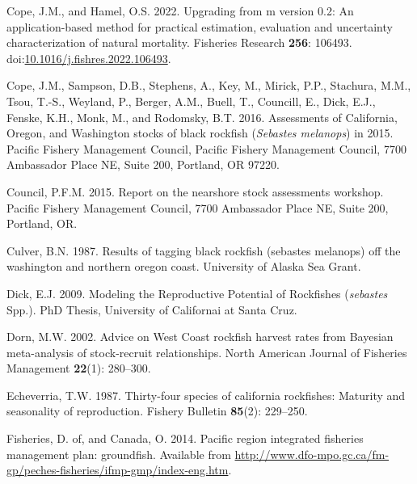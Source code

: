 \documentclass[11pt,
  english,
  letterpaper,
]{article}
\newlength{\cslhangindent}
\newenvironment{CSLReferences}[2] %
 {%
  \setlength{\parindent}{0pt}
  \ifodd #1 \everypar{\setlength{\hangindent}{\cslhangindent}}\ignorespaces\fi
  \ifnum #2 > 0
  \setlength{\parskip}{#2\baselineskip}
  \fi
 }%
 {}
\begin{document}
\begin{CSLReferences}{1}{0}
\leavevmode{}%
Cope, J.M., and Hamel, O.S. 2022. Upgrading from m version 0.2: An application-based method for practical estimation, evaluation and uncertainty characterization of natural mortality. Fisheries Research \textbf{256}: 106493. doi:\href{https://doi.org/10.1016/j.fishres.2022.106493}{10.1016/j.fishres.2022.106493}.

\leavevmode{}%
Cope, J.M., Sampson, D.B., Stephens, A., Key, M., Mirick, P.P., Stachura, M.M., Tsou, T.-S., Weyland, P., Berger, A.M., Buell, T., Councill, E., Dick, E.J., Fenske, K.H., Monk, M., and Rodomsky, B.T. 2016. Assessments of {California}, {Oregon}, and {Washington} stocks of black rockfish (\emph{{Sebastes} melanops}) in 2015. Pacific Fishery Management Council, Pacific Fishery Management Council, 7700 Ambassador Place NE, Suite 200, Portland, OR 97220.

\leavevmode{}%
Council, P.F.M. 2015. Report on the nearshore stock assessments workshop. Pacific Fishery Management Council, 7700 Ambassador Place NE, Suite 200, Portland, OR.

\leavevmode{}%
Culver, B.N. 1987. Results of tagging black rockfish (sebastes melanops) off the washington and northern oregon coast. University of Alaska Sea Grant.

\leavevmode{}%
Dick, E.J. 2009. Modeling the {Reproductive} {Potential} of {Rockfishes} (\emph{sebastes} {Spp}.). PhD Thesis, University of Californai at Santa Cruz.

\leavevmode{}%
Dorn, M.W. 2002. Advice on {West} {Coast} rockfish harvest rates from {B}ayesian meta-analysis of stock-recruit relationships. North American Journal of Fisheries Management \textbf{22}(1): 280--300.

\leavevmode{}%
Echeverria, T.W. 1987. Thirty-four species of california rockfishes: Maturity and seasonality of reproduction. Fishery Bulletin \textbf{85}(2): 229--250.

\leavevmode{}%
Fisheries, D. of, and Canada, O. 2014. Pacific region integrated fisheries management plan: groundfish. Available from \url{http://www.dfo-mpo.gc.ca/fm-gp/peches-fisheries/ifmp-gmp/index-eng.htm}.


\end{CSLReferences}
\end{document}
